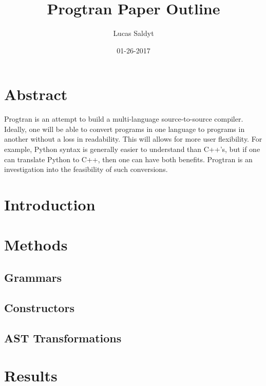 \documentclass{article}
\title{Progtran Paper Outline}
\date{01-26-2017}
\author{Lucas Saldyt}
\begin{document}
\maketitle
{}
\newpage
{}

\section{Abstract}
Progtran is an attempt to build a multi-language source-to-source compiler. Ideally, one will be able to convert programs in one language to programs in another without a loss in readability. This will allows for more user flexibility. For example, Python syntax is generally easier to understand than C++'s, but if one can translate Python to C++, then one can have both benefits. Progtran is an investigation into the feasibility of such conversions.
\section{Introduction}
\section{Methods}
\subsection{Grammars}
\subsection{Constructors}
\subsection{AST Transformations}
\section{Results}
\end{document}
